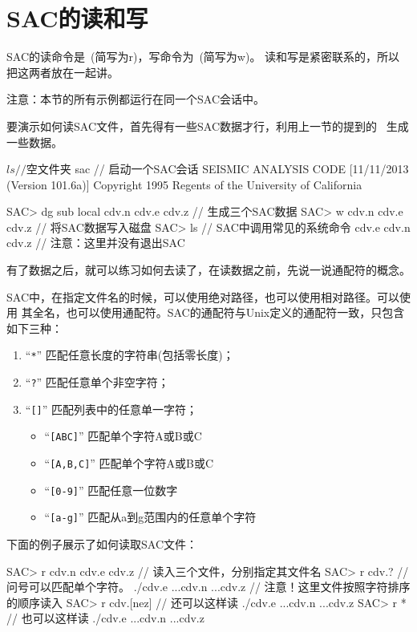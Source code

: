 \section{SAC的读和写}
\label{sec:read-and-write}
SAC的读命令是~(简写为r)，写命令为~(简写为w)。
读和写是紧密联系的，所以把这两者放在一起讲。

注意：本节的所有示例都运行在同一个SAC会话中。

要演示如何读SAC文件，首先得有一些SAC数据才行，利用上一节的提到的~
生成一些数据。
\begin{SACCode}
$ ls                // 空文件夹
$ sac               // 启动一个SAC会话
 SEISMIC ANALYSIS CODE [11/11/2013 (Version 101.6a)]
 Copyright 1995 Regents of the University of California

SAC> dg sub local cdv.n cdv.e cdv.z     // 生成三个SAC数据
SAC> w cdv.n cdv.e cdv.z                // 将SAC数据写入磁盘
SAC> ls                                 // SAC中调用常见的系统命令
cdv.e  cdv.n  cdv.z
                                        // 注意：这里并没有退出SAC
\end{SACCode}

有了数据之后，就可以练习如何去读了，在读数据之前，先说一说通配符的概念。

SAC中，在指定文件名的时候，可以使用绝对路径，也可以使用相对路径。可以使用
其全名，也可以使用通配符。SAC的通配符与Unix定义的通配符一致，只包含如下三种：
\begin{enumerate}
\item ``\verb+*+'' 匹配任意长度的字符串(包括零长度)；
\item ``\verb+?+'' 匹配任意单个非空字符；
\item ``\verb+[]+'' 匹配列表中的任意单一字符；
    \begin{itemize}
        \item ``\verb+[ABC]+'' 匹配单个字符A或B或C
        \item ``\verb+[A,B,C]+'' 匹配单个字符A或B或C
        \item ``\verb+[0-9]+'' 匹配任意一位数字
        \item ``\verb+[a-g]+'' 匹配从a到g范围内的任意单个字符
    \end{itemize}
\end{enumerate}

下面的例子展示了如何读取SAC文件：
\begin{SACCode}
SAC> r cdv.n cdv.e cdv.z    // 读入三个文件，分别指定其文件名
SAC> r cdv.?                // 问号可以匹配单个字符。
./cdv.e ...cdv.n ...cdv.z   // 注意！这里文件按照字符排序的顺序读入
SAC> r cdv.[nez]            // 还可以这样读
./cdv.e ...cdv.n ...cdv.z
SAC> r *                    // 也可以这样读
./cdv.e ...cdv.n ...cdv.z
\end{SACCode}

